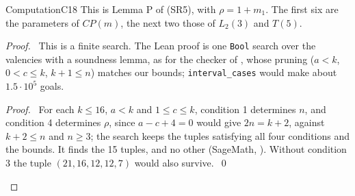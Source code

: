 \begin{namedresult}{Computation}{C18}\label{comp:C18}
 \uses{}
 This is Lemma P of  (SR5), with $\rho=1+m_1$. The first six are
 the parameters of $CP(m)$, the next two those of $L_2(3)$ and $T(5)$.
\end{namedresult}
\begin{proof}
 \pfsketch\ This is a finite search. The Lean proof is one \texttt{Bool} search over the
 valencies with a soundness lemma, as for the checker  of
 , whose pruning ($a<k$, $0<c\le k$, $k+1\le n$)
 matches our bounds; \texttt{interval\_cases} would make about $1.5\cdot10^5$ goals.
 \qedstep
 \begin{proof}\pf\ For each $k\le16$, $a<k$ and $1\le c\le k$, condition 1 determines $n$, and
  condition 4 determines $\rho$, since $a-c+4=0$ would give $2n=k+2$, against $k+2\le n$ and
  $n\ge3$; the search keeps the tuples satisfying all four
  conditions and the bounds. It finds the 15 tuples, and no other (SageMath,
  ).
  Without condition 3 the tuple $(21,16,12,12,7)$ would also survive.~\qed\end{proof}
\end{proof}

